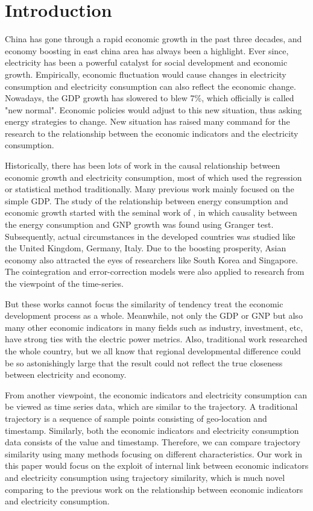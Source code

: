 
\section{Introduction}
China has gone through a rapid economic growth in the past three decades, and economy boosting in east china area has always been a highlight. Ever since, electricity has been a powerful catalyst for social development and economic growth. Empirically, economic fluctuation would cause changes in electricity consumption and electricity consumption can also reflect the economic change. Nowadays, the GDP growth has slowered to blew 7\%, which officially is called "new normal". Economic policies would adjust to this new situation, thus asking energy strategies to change. New situation has raised many command for the research to the relationship between the economic indicators and the electricity consumption. 

Historically, there has been lots of work in the causal relationship between economic growth and electricity consumption, most of which used the regression or statistical method traditionally. Many previous work mainly focused on the simple GDP. The study of the relationship between energy consumption and economic growth started with the seminal work of \cite{kraft:relationship}, in which causality between the energy consumption and GNP growth was found using Granger test. Subsequently, actual circumstances in the developed countries was studied like the United Kingdom, Germany, Italy\cite{yu:causal, erol1987causal}. Due to the boosting prosperity, Asian economy also attracted the eyes of researchers like South Korea and Singapore. The cointegration and error-correction models were also applied to research from the viewpoint of the time-series\cite{glasure1998cointegration}.

But these works cannot focus the similarity of tendency treat the economic development process as a whole. Meanwhile, not only the GDP or GNP but also many other economic indicators in many fields such as industry, investment, etc, have strong ties with the electric power metrics. Also, traditional work researched the whole country, but we all know that regional developmental difference could be so astonishingly large that the result could not reflect the true closeness between electricity and economy.  

From another viewpoint, the economic indicators and electricity consumption can be viewed as time series data, which are similar to the trajectory. A traditional trajectory is a sequence of sample points consisting of geo-location and timestamp. Similarly, both the economic indicators and electricity consumption data consists of the value and timestamp. Therefore, we can compare trajectory similarity using many methods focusing on different characteristics. Our work in this paper would focus on the exploit of internal link between economic indicators and electricity consumption using trajectory similarity, which is much novel comparing to the previous work on the relationship between economic indicators and electricity consumption. 

